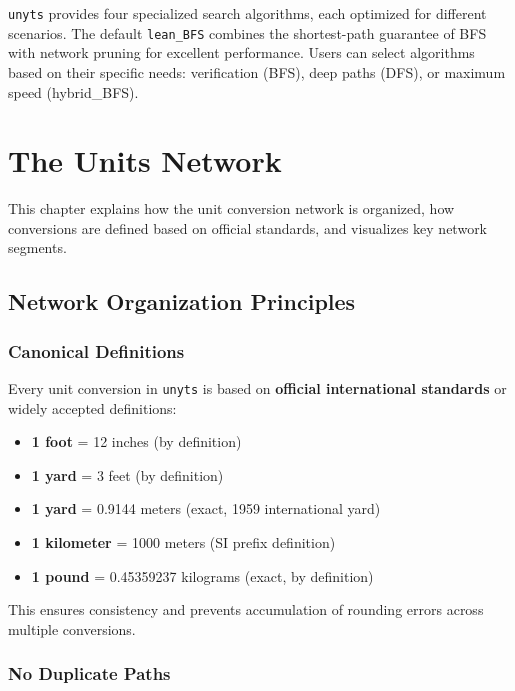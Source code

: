 \documentclass[11pt,a4paper]{report}
\begin{document}
\texttt{unyts} provides four specialized search algorithms, each optimized for different scenarios. The default \texttt{lean\_BFS} combines the shortest-path guarantee of BFS with network pruning for excellent performance. Users can select algorithms based on their specific needs: verification (BFS), deep paths (DFS), or maximum speed (hybrid\_BFS).


\chapter{The Units Network}

This chapter explains how the unit conversion network is organized, how conversions are defined based on official standards, and visualizes key network segments.

\section{Network Organization Principles}

\subsection{Canonical Definitions}

Every unit conversion in \texttt{unyts} is based on \textbf{official international standards} or widely accepted definitions:

\begin{itemize}[leftmargin=*]
  \item \textbf{1 foot} = 12 inches (by definition)
  \item \textbf{1 yard} = 3 feet (by definition)
  \item \textbf{1 yard} = 0.9144 meters (exact, 1959 international yard)
  \item \textbf{1 kilometer} = 1000 meters (SI prefix definition)
  \item \textbf{1 pound} = 0.45359237 kilograms (exact, by definition)
\end{itemize}

This ensures consistency and prevents accumulation of rounding errors across multiple conversions.

\subsection{No Duplicate Paths}
\end{document}
